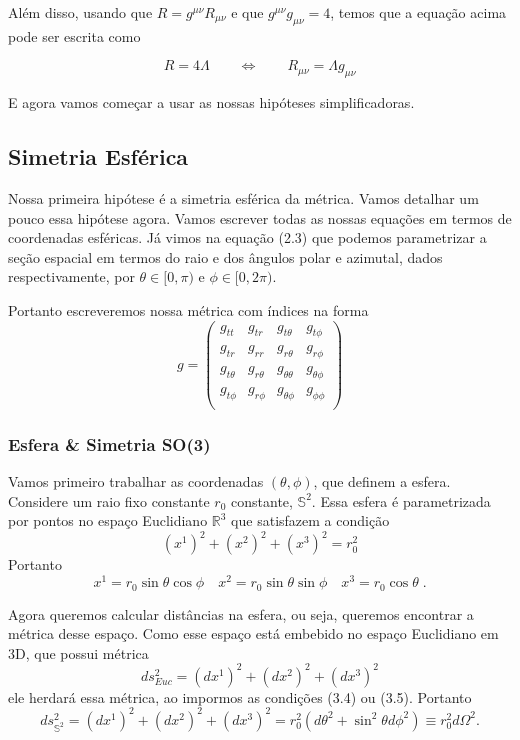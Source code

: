 \documentclass[11pt]{article}
\begin{document}
Além disso, usando que \(R = g^{\mu\nu} R_{\mu\nu}\) e que
\(g^{\mu\nu} g_{\mu\nu} = 4\), temos que a equação acima pode ser
escrita como

\[ \tag{3.3.b} R = 4\Lambda
\qquad \Leftrightarrow \qquad R_{\mu\nu} = \Lambda g_{\mu\nu}\]

E agora vamos começar a usar as nossas hipóteses simplificadoras.

    \hypertarget{simetria-esfuxe9rica}{%
\subsection{Simetria Esférica}\label{simetria-esfuxe9rica}}

    Nossa primeira hipótese é a simetria esférica da métrica. Vamos detalhar
um pouco essa hipótese agora. Vamos escrever todas as nossas equações em
termos de coordenadas esféricas. Já vimos na equação (2.3) que podemos
parametrizar a seção espacial em termos do raio e dos ângulos polar e
azimutal, dados respectivamente, por \(\theta \in [0, \pi)\) e
\(\phi \in [0, 2\pi)\).

Portanto escreveremos nossa métrica com índices na forma
\[ \tag{3.4} g = 
\begin{pmatrix}
g_{tt} & g_{tr}& g_{t\theta} & g_{t\phi} \\
g_{tr} & g_{rr} & g_{r\theta} & g_{r \phi} \\
g_{t\theta} & g_{r \theta} & g_{\theta \theta} & g_{\theta \phi} \\
g_{t\phi} & g_{r \phi} & g_{\theta\phi} & g_{\phi\phi} \\
\end{pmatrix} \]

    \hypertarget{esfera-simetria-so3}{%
\subsubsection{Esfera \& Simetria SO(3)}\label{esfera-simetria-so3}}

    Vamos primeiro trabalhar as coordenadas \((\theta, \phi)\), que definem
a esfera. Considere um raio fixo constante \(r_0\) constante,
\(\mathbb{S}^2\). Essa esfera é parametrizada por pontos no espaço
Euclidiano \(\mathbb{R}^3\) que satisfazem a condição
\[\tag{3.5} (x^1)^2 + (x^2)^2 + (x^3)^2 = r_0^2 \] Portanto
\[ \tag{3.6} x^1 = r_0 \sin\theta \cos\phi\quad x^2 = r_0 \sin\theta \sin\phi\quad  x^3 = r_0 \cos\theta\; .\]

Agora queremos calcular distâncias na esfera, ou seja, queremos
encontrar a métrica desse espaço. Como esse espaço está embebido no
espaço Euclidiano em 3D, que possui métrica
\[ ds^2_{Euc} = (dx^1)^2 + (dx^2)^2 + (dx^3)^2 \] ele herdará essa
métrica, ao impormos as condições (3.4) ou (3.5). Portanto
\[ \tag{3.7} ds^2_{\mathbb{S}^2} = (dx^1)^2 + (dx^2)^2 + (dx^3)^2 = r_0^2 (d\theta^2 + \sin^2\theta d\phi^2) \equiv r_0^2  d\Omega^2.\]
\end{document}

